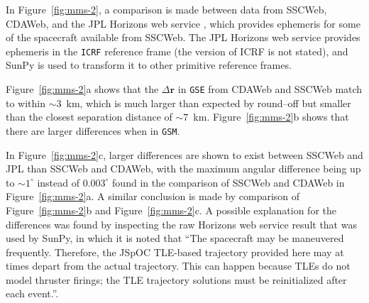 \documentclass[draft]{agujournal2019}
\begin{document}



In Figure~\ref{fig:mms-2}, a comparison is made between data from SSCWeb, CDAWeb, and the JPL Horizons web service \cite{JPLHorizons}, which provides ephemeris for some of the spacecraft available from SSCWeb. The JPL Horizons web service provides ephemeris in the \texttt{ICRF} reference frame (the version of ICRF is not stated), and SunPy is used to transform it to other primitive reference frames.

Figure~\ref{fig:mms-2}a shows that the $\Delta \mathbf{r}$ in \texttt{GSE} from CDAWeb and SSCWeb match to within ${\sim}3$~km, which is much larger than expected by round--off but smaller than the closest separation distance of ${\sim}7$~km. Figure~\ref{fig:mms-2}b shows that there are larger differences when in \texttt{GSM}.

In Figure~\ref{fig:mms-2}c, larger differences are shown to exist between SSCWeb and JPL than SSCWeb and CDAWeb, with the maximum angular difference being up to $\sim 1^\circ$ instead of $0.003^\circ$ found in the comparison of SSCWeb and CDAWeb in Figure~\ref{fig:mms-2}a. A similar conclusion is made by comparison of Figure~\ref{fig:mms-2}b and Figure~\ref{fig:mms-2}c. A possible explanation for the differences was found by inspecting the raw Horizons web service result that was used by SunPy, in which it is noted that ``The spacecraft may be maneuvered frequently. Therefore, the JSpOC TLE-based trajectory provided here may at times depart from the actual trajectory. This can happen because TLEs do not model thruster firings; the TLE trajectory solutions must be reinitialized after each event.''.

\end{document}
